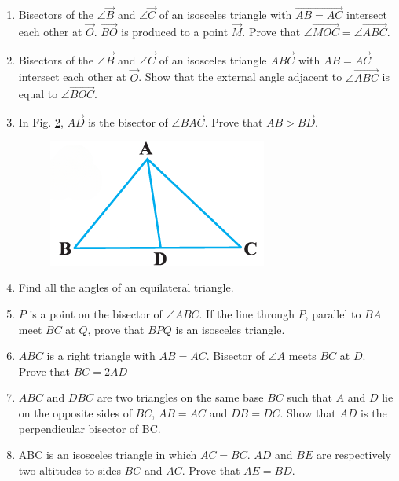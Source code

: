 \begin{enumerate}[label=\arabic*.,ref=\thesubsection.\theenumi]
\begin{figure}[h]
	\caption{}
	\label{fig:exemplar/9.7.37.3.8}
\end{figure}
\item Bisectors of the $\angle \vec{B}$ and $\angle \vec{C}$ of an isosceles triangle with $\vec{AB=AC}$ intersect each other at $\vec{O}$. $\vec{BO}$ is produced to a point $\vec{M}$. Prove that $\angle \vec{MOC}= \angle \vec{ABC}$.
\item Bisectors of the $\angle \vec{B}$ and $\angle \vec{C}$ of an isosceles triangle $\vec{ABC}$ with $\vec{AB=AC}$ intersect each other at $\vec{O}$. Show that the external angle adjacent to $\angle \vec{ABC}$ is equal to $\angle \vec{BOC}$.
\item In Fig. \ref{fig:exemplar/9.7.37.3.11}, $\vec{AD}$ is the bisector of $\angle \vec{BAC}$. Prove that $\vec{AB>BD}$.
\begin{figure}[h]
	\centering
	\includegraphics[width=\columnwidth]{chapters/exemplar/9.7.3/figs/Figure5.png}
	\caption{}
	\label{fig:exemplar/9.7.37.3.11}
\end{figure}
\item Find all the angles of an equilateral triangle.
\item $P$ is a point on the bisector of $\angle ABC$. If the line through $P$, parallel to $BA$ meet $BC$ at $Q$, prove that $BPQ$ is an isosceles triangle.
\item $ABC$ is a right triangle with $AB = AC$. Bisector of $\angle A$ meets $BC$ at $D$. Prove that $BC = 2 AD$
\item $ABC$ and $DBC$ are two triangles on the same base $BC$ such that $A$ and $D$ lie on the opposite sides of $BC$, $AB = AC$ and $DB = DC$. Show that $AD$ is the perpendicular bisector of BC.
\item ABC is an isosceles triangle in which $AC = BC$. $AD$ and $BE$ are respectively two altitudes to sides $BC$ and $AC$. Prove that $AE = BD$.

\end{enumerate}
